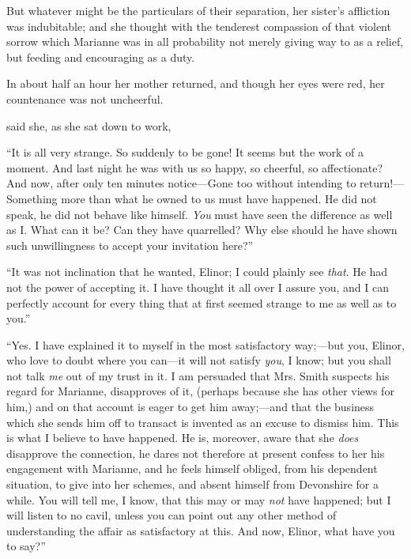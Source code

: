 But whatever might be the particulars of their separation, her sister's affliction was indubitable; and she thought with the tenderest compassion of that violent sorrow which Marianne was in all probability not merely giving way to as a relief, but feeding and encouraging as a duty.

In about half an hour her mother returned, and though her eyes were red, her countenance was not uncheerful.

 said she, as she sat down to work, 

“It is all very strange. So suddenly to be gone! It seems but the work of a moment. And last night he was with us so happy, so cheerful, so affectionate? And now, after only ten minutes notice---Gone too without intending to return!---Something more than what he owned to us must have happened. He did not speak, he did not behave like himself. {\em You} must have seen the difference as well as I. What can it be? Can they have quarrelled? Why else should he have shown such unwillingness to accept your invitation here?”

“It was not inclination that he wanted, Elinor; I could plainly see {\em that}. He had not the power of accepting it. I have thought it all over I assure you, and I can perfectly account for every thing that at first seemed strange to me as well as to you.”


“Yes. I have explained it to myself in the most satisfactory way;---but you, Elinor, who love to doubt where you can---it will not satisfy {\em you}, I know; but you shall not talk {\em me} out of my trust in it. I am persuaded that Mrs. Smith suspects his regard for Marianne, disapproves of it, (perhaps because she has other views for him,) and on that account is eager to get him away;---and that the business which she sends him off to transact is invented as an excuse to dismiss him. This is what I believe to have happened. He is, moreover, aware that she {\em does} disapprove the connection, he dares not therefore at present confess to her his engagement with Marianne, and he feels himself obliged, from his dependent situation, to give into her schemes, and absent himself from Devonshire for a while. You will tell me, I know, that this may or may {\em not} have happened; but I will listen to no cavil, unless you can point out any other method of understanding the affair as satisfactory at this. And now, Elinor, what have you to say?”

